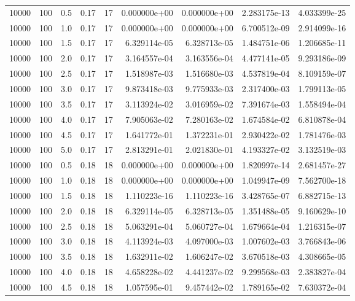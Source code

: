 \begin{tabular}{rrrrrrrrr}
 10000 &  100 &  0.5 &  0.17 &    17 &  0.000000e+00 &  0.000000e+00 &  2.283175e-13 &  4.033399e-25 \\
 10000 &  100 &  1.0 &  0.17 &    17 &  0.000000e+00 &  0.000000e+00 &  6.700512e-09 &  2.914099e-16 \\
 10000 &  100 &  1.5 &  0.17 &    17 &  6.329114e-05 &  6.328713e-05 &  1.484751e-06 &  1.206685e-11 \\
 10000 &  100 &  2.0 &  0.17 &    17 &  3.164557e-04 &  3.163556e-04 &  4.477141e-05 &  9.293186e-09 \\
 10000 &  100 &  2.5 &  0.17 &    17 &  1.518987e-03 &  1.516680e-03 &  4.537819e-04 &  8.109159e-07 \\
 10000 &  100 &  3.0 &  0.17 &    17 &  9.873418e-03 &  9.775933e-03 &  2.317400e-03 &  1.799113e-05 \\
 10000 &  100 &  3.5 &  0.17 &    17 &  3.113924e-02 &  3.016959e-02 &  7.391674e-03 &  1.558494e-04 \\
 10000 &  100 &  4.0 &  0.17 &    17 &  7.905063e-02 &  7.280163e-02 &  1.674584e-02 &  6.810878e-04 \\
 10000 &  100 &  4.5 &  0.17 &    17 &  1.641772e-01 &  1.372231e-01 &  2.930422e-02 &  1.781476e-03 \\
 10000 &  100 &  5.0 &  0.17 &    17 &  2.813291e-01 &  2.021830e-01 &  4.193327e-02 &  3.132519e-03 \\
 10000 &  100 &  0.5 &  0.18 &    18 &  0.000000e+00 &  0.000000e+00 &  1.820997e-14 &  2.681457e-27 \\
 10000 &  100 &  1.0 &  0.18 &    18 &  0.000000e+00 &  0.000000e+00 &  1.049947e-09 &  7.562700e-18 \\
 10000 &  100 &  1.5 &  0.18 &    18 &  1.110223e-16 &  1.110223e-16 &  3.428765e-07 &  6.882715e-13 \\
 10000 &  100 &  2.0 &  0.18 &    18 &  6.329114e-05 &  6.328713e-05 &  1.351488e-05 &  9.160629e-10 \\
 10000 &  100 &  2.5 &  0.18 &    18 &  5.063291e-04 &  5.060727e-04 &  1.679664e-04 &  1.216315e-07 \\
 10000 &  100 &  3.0 &  0.18 &    18 &  4.113924e-03 &  4.097000e-03 &  1.007602e-03 &  3.766843e-06 \\
 10000 &  100 &  3.5 &  0.18 &    18 &  1.632911e-02 &  1.606247e-02 &  3.670518e-03 &  4.308665e-05 \\
 10000 &  100 &  4.0 &  0.18 &    18 &  4.658228e-02 &  4.441237e-02 &  9.299568e-03 &  2.383827e-04 \\
 10000 &  100 &  4.5 &  0.18 &    18 &  1.057595e-01 &  9.457442e-02 &  1.789165e-02 &  7.630372e-04 \\

\end{tabular}

